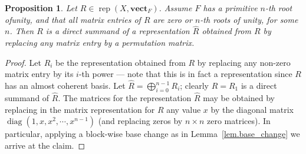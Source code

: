 \documentclass[a4paper]{amsart}
\theoremstyle{plain}
\newtheorem{proposition}[theorem]{Proposition}
\theoremstyle{definition}
\theoremstyle{remark}
\newcommand{\vectF}{\mathbf{vect}_F}
\DeclareMathOperator{\rep}{rep}
\begin{document}
\begin{proposition} \label{prop.roots->permutations}
Let $R \in \rep(X,\vectF)$. Assume \( F \) has a primitive \( n \)-th root ofunity, and that all matrix entries of \( R \) are zero or \( n \)-th roots of unity, for some \( n \). Then \( R \) is a direct summand of a representation \( \widehat R \) obtained from \( R \) by replacing any matrix entry by a permutation matrix.
\end{proposition}

\begin{proof}
Let \( R_i \) be the representation obtained from \( R \) by replacing any non-zero matrix entry by its \( i \)-th power --- note that this is in fact a representation since \( R \) has an almost coherent basis. Let \( \widehat R = \bigoplus_{i=0}^{n-1} R_i \); clearly \( R = R_1 \) is a direct summand of \( \widehat R \). The matrices for the representation \( \widehat{R} \) may be obtained by replacing in the matrix representation for \( R \) any value \( x \) by the diagonal matrix \( \operatorname{diag}(1, x, x^2, \cdots, x^{n-1}) \) (and replacing zeros by \( n \times n \) zero matrices). In particular, applying a block-wise base change as in Lemma~\ref{lem.base_change} we arrive at the claim.
\end{proof}
\end{document}
